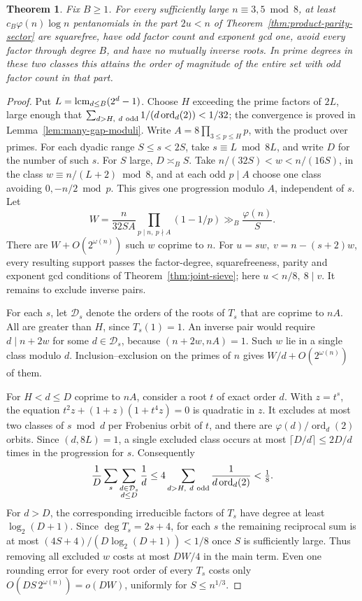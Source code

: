 \documentclass[11pt]{article}
\newtheorem{theorem}{Theorem}
\newcommand{\ord}{\operatorname{ord}}
\begin{document}
\begin{theorem}\label{thm:odd-joint-log}
Fix \(B\ge1\). For every sufficiently large \(n\equiv3,5\bmod8\),
at least \(c_B\varphi(n)\log n\) pentanomials in the part \(2u<n\)
of Theorem~\ref{thm:product-parity-sector} are squarefree, have odd
factor count and exponent gcd one, avoid every factor through degree
\(B\), and have no mutually inverse roots. In prime degrees in these
two classes this attains the order of magnitude of the entire set
with odd factor count in that part.
\end{theorem}
\begin{proof}
Put \(L=\mathop{\rm lcm}_{d\le B}(2^d-1)\).
Choose \(H\) exceeding the prime factors of \(2L\), large enough that
\(\sum_{d>H,\ d\ {\rm odd}}1/(d\ord_d(2))<1/32\);
the convergence is proved in Lemma~\ref{lem:many-gap-moduli}.
Write \(A=8\prod_{3\le p\le H}p\), with the product over primes.
For each dyadic range \(S\le s<2S\), take \(s\equiv L\bmod 8L\),
and write \(D\) for the number of such \(s\).
For \(S\) large, \(D\asymp_B S\).
Take \(n/(32S)<w<n/(16S)\), in the class \(w\equiv n/(L+2)\bmod8\),
and at each odd \(p\mid A\) choose one class avoiding \(0,-n/2\bmod p\).
This gives one progression modulo \(A\), independent of \(s\).
Let
\[
 W=\frac{n}{32SA}\prod_{p\mid n,\ p\nmid A}(1-1/p)
       \gg_B \frac{\varphi(n)}{S}.
\]
There are \(W+O(2^{\omega(n)})\) such \(w\) coprime to \(n\).
For \(u=sw,\ v=n-(s+2)w\), every resulting support passes the
factor-degree, squarefreeness, parity and exponent gcd conditions
of Theorem~\ref{thm:joint-sieve}; here \(u<n/8,\ 8\mid v\).
It remains to exclude inverse pairs.

For each \(s\), let \(\mathcal D_s\) denote the orders of the roots
of \(T_s\) that are coprime to \(nA\). All are greater than \(H\),
since \(T_s(1)=1\). An inverse pair would require \(d\mid n+2w\)
for some \(d\in\mathcal D_s\), because \((n+2w,nA)=1\).
Such \(w\) lie in a single class modulo \(d\). Inclusion--exclusion
on the primes of \(n\) gives \(W/d+O(2^{\omega(n)})\) of them.

For \(H<d\le D\) coprime to \(nA\), consider a root \(t\) of
exact order \(d\). With \(z=t^s\), the equation
\(t^2 z+(1+z)(1+t^4z)=0\) is quadratic in \(z\).
It excludes at most two classes of \(s\bmod d\) per Frobenius orbit
of \(t\), and there are \(\varphi(d)/\ord_d(2)\) orbits.
Since \((d,8L)=1\), a single excluded class occurs at most
\(\lceil D/d\rceil\le2D/d\) times in the progression for \(s\).
Consequently
\[
 \frac1D\sum_s\sum_{\substack{d\in\mathcal D_s\\d\le D}}\frac1d
 \le 4\sum_{d>H,\ d\ {\rm odd}}\frac1{d\ord_d(2)}<\tfrac18 .
\]
For \(d>D\), the corresponding irreducible factors of \(T_s\) have
degree at least \(\log_2(D+1)\). Since \(\deg T_s=2s+4\), for
each \(s\) the remaining reciprocal sum is at most
\((4S+4)/(D\log_2(D+1))<1/8\) once \(S\) is sufficiently large.
Thus removing all excluded \(w\) costs at most \(DW/4\)
in the main term. Even one rounding error for every root order of
every \(T_s\) costs only \(O(DS\,2^{\omega(n)})=o(DW)\), uniformly
for \(S\le n^{1/3}\).


\end{proof}
\end{document}

